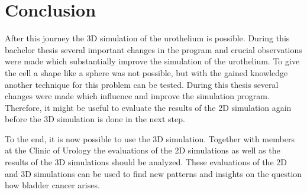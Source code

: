 \chapter{Conclusion}
After this journey the 3D simulation of the urothelium is possible. During this bachelor thesis several important changes in the program and crucial observations were made which substantially improve the simulation of the urothelium. To give the cell a shape like a sphere was not possible, but with the gained knowledge another technique for this problem can be tested. During this thesis several changes were made which influence and improve the simulation program. Therefore, it might be useful to evaluate the results of the 2D simulation again before the 3D simulation is done in the next step. 

To the end, it is now possible to use the 3D simulation. Together with members at the Clinic of Urology the evaluations of the 2D simulations as well as the results of the 3D simulations should be analyzed. These evaluations of the 2D and 3D simulations can be used to find new patterns and insights on the question how bladder cancer arises.